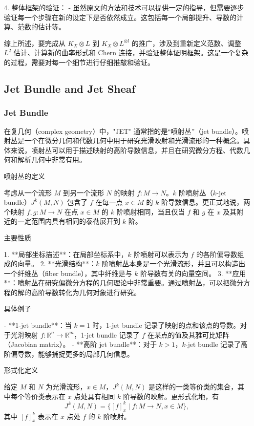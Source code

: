 \documentclass[lang=cn,12pt,a4paper,fontset=none]{beautybook}
\begin{document}
4. 整体框架的验证：
   - 虽然原文的方法和技术可以提供一定的指导，但需要逐步验证每一个步骤在新的设定下是否依然成立。这包括每一个局部提升、导数的计算、范数的估计等。

综上所述，要完成从 $K_X \otimes L$ 到 $K_X \otimes L^{\otimes l}$ 的推广，涉及到重新定义范数、调整 $L^2$ 估计、计算新的曲率形式和 Chern 连接，并验证整体证明框架。这是一个复杂的过程，需要对每一个细节进行仔细推敲和验证。

\subsection{Jet Bundle and Jet Sheaf}
\subsubsection*{Jet Bundle}
在复几何（complex geometry）中，"JET" 通常指的是“喷射丛”（jet bundle）。喷射丛是一个在微分几何和代数几何中用于研究光滑映射和光滑流形的一种概念。具体来说，喷射丛可以用于描述映射的高阶导数信息，并且在研究微分方程、代数几何和解析几何中非常有用。

喷射丛的定义

考虑从一个流形 $M$ 到另一个流形 $N$ 的映射 $f: M \to N$。$k$ 阶喷射丛（$k$-jet bundle）$J^k(M, N)$ 包含了 $f$ 在每一点 $x \in M$ 的 $k$ 阶导数信息。更正式地说，两个映射 $f, g: M \to N$ 在点 $x \in M$ 的 $k$ 阶喷射相同，当且仅当 $f$ 和 $g$ 在 $x$ 及其附近的一定范围内具有相同的泰勒展开到 $k$ 阶。

主要性质

1. **局部坐标描述**：在局部坐标系中，$k$ 阶喷射可以表示为 $f$ 的各阶偏导数组成的向量。
2. **光滑结构**：$k$ 阶喷射丛本身是一个光滑流形，并且可以构造出一个纤维丛（fiber bundle），其中纤维是与 $k$ 阶导数有关的向量空间。
3. **应用**：喷射丛在研究偏微分方程的几何理论中非常重要。通过喷射丛，可以把微分方程的解的高阶导数转化为几何对象进行研究。

具体例子

- **1-jet bundle**：当 $k=1$ 时，1-jet bundle 记录了映射的点和该点的导数。对于光滑映射 $f: \mathbb{R}^n \to \mathbb{R}^m$，1-jet bundle 记录了 $f$ 在某点的值及其雅可比矩阵（Jacobian matrix）。
- **高阶 jet bundle**：对于 $k > 1$，$k$-jet bundle 记录了高阶偏导数，能够捕捉更多的局部几何信息。

形式化定义

给定 $M$ 和 $N$ 为光滑流形，$x \in M$，$J^k(M, N)$ 是这样的一类等价类的集合，其中每个等价类表示在 $x$ 点处具有相同 $k$ 阶导数的映射。更形式化地，有
$$ J^k(M, N) = \{ [f]_x^k \mid f: M \to N, x \in M \}, $$
其中 $[f]_x^k$ 表示在 $x$ 点处 $f$ 的 $k$ 阶喷射。
\end{document}
